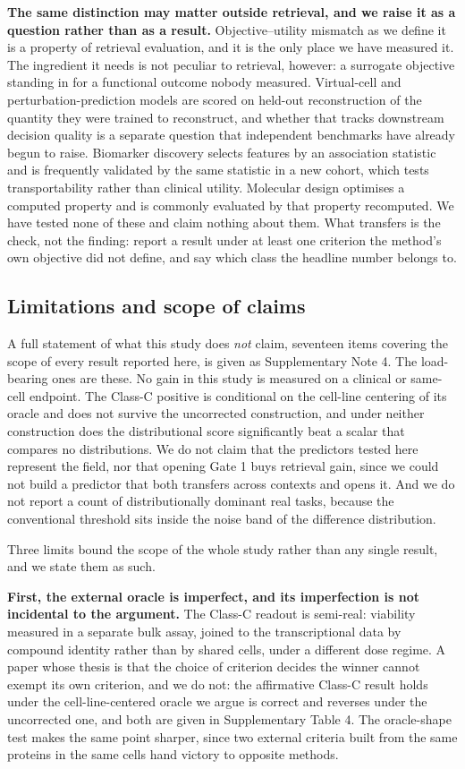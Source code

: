 \documentclass[11pt,letterpaper]{article}
\begin{document}
\textbf{The same distinction may matter outside retrieval, and we raise it as a question rather
than as a result.} Objective--utility mismatch as we define it is a property of retrieval
evaluation, and it is the only place we have measured it. The ingredient it needs is not peculiar
to retrieval, however: a surrogate objective standing in for a functional outcome nobody measured.
Virtual-cell and perturbation-prediction models are scored on held-out reconstruction of the
quantity they were trained to reconstruct, and whether that tracks downstream decision quality is
a separate question that independent benchmarks have already begun to
raise\cite{ref13,ref14,VirtualCellChallenge}. Biomarker discovery selects features by an
association statistic and is frequently validated by the same statistic in a new cohort, which
tests transportability rather than clinical utility. Molecular design optimises a computed
property and is commonly evaluated by that property recomputed. We have tested none of these and
claim nothing about them. What transfers is the check, not the finding: report a result under at
least one criterion the method's own objective did not define, and say which class the headline
number belongs to.

\subsection*{Limitations and scope of claims}

A full statement of what this study does \emph{not} claim, seventeen items covering the scope of
every result reported here, is given as Supplementary Note 4. The load-bearing ones are these. No
gain in this study is measured on a clinical or same-cell endpoint. The Class-C positive is
conditional on the cell-line centering of its oracle and does not survive the uncorrected
construction, and under neither construction does the distributional score significantly beat a
scalar that compares no distributions. We do not claim that the predictors tested here represent
the field, nor that opening Gate 1 buys retrieval gain, since we could not build a predictor that
both transfers across contexts and opens it. And we do not report a count of distributionally
dominant real tasks, because the conventional threshold sits inside the noise band of the
difference distribution.

Three limits bound the scope of the whole study rather than any single result, and we state them
as such.

\textbf{First, the external oracle is imperfect, and its imperfection is not incidental to the
argument.} The Class-C readout is semi-real: viability measured in a separate bulk assay, joined
to the transcriptional data by compound identity rather than by shared cells, under a different
dose regime. A paper whose thesis is that the choice of criterion decides the winner cannot exempt
its own criterion, and we do not: the affirmative Class-C result holds under the cell-line-centered
oracle we argue is correct and reverses under the uncorrected one, and both are given in
Supplementary Table 4. The oracle-shape test makes the same point sharper, since two external
criteria built from the same proteins in the same cells hand victory to opposite methods.
\end{document}
